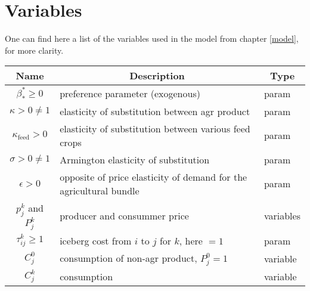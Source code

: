 \section{Variables}\label{appendix:variables}

One can find here a list of the variables used in the model from chapter \ref{model}, for more clarity.

\begin{tabular}{c|l|l}
    \multicolumn{1}{c}{Name}                    & \multicolumn{1}{|c|}{Description}                                  & \multicolumn{1}{c}{Type} \\
    \hline
    $\beta_*^* \ge 0$                           & preference parameter (exogenous)                                   & param                    \\

    $\kappa > 0 \neq 1$                         & elasticity of substitution between agr product                     & param                    \\

    $\kappa_{\text{feed}} > 0$                  & elasticity of substitution between various feed crops              & param                    \\

    $\sigma > 0 \neq 1$                         & Armington elasticity of substitution                               & param                    \\

    $\epsilon > 0$                              & opposite of price elasticity of demand for the agricultural bundle & param                    \\

    $p_j^k$ and $P_j^k$                         & producer and consummer price                                       & variables                \\

    $\tau_{ij}^k \ge 1$                         & iceberg cost from $i$ to $j$ for $k$, here $=1$                    & param                    \\

    $C_j^0$                                     & consumption of non-agr product, $P_j^0 = 1$                        & variable                 \\

    $C_j^k$                                     & consumption                                                        & variable                 \\


\end{tabular}
